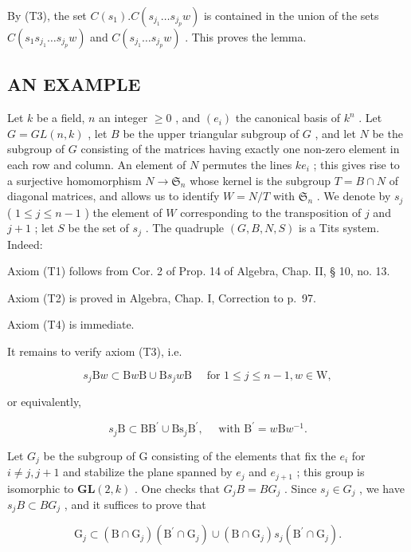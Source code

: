 By (T3), the set \(C(s_{1}).C(s_{j_{1}}\ldots s_{j_{p}}w)\) is contained in the union of the sets \(C(s_{1}s_{j_{1}}\ldots s_{j_{p}}w)\) and \(C(s_{j_{1}}\ldots s_{j_{p}}w)\) . This proves the lemma.

\subsection{AN EXAMPLE}

Let \(k\) be a field, \(n\) an integer \(\geqslant 0\) , and \((e_i)\) the canonical basis of \(k^n\) . Let \(G = GL(n, k)\) , let \(B\) be the upper triangular subgroup of \(G\) , and let \(N\) be the subgroup of \(G\) consisting of the matrices having exactly one non-zero element in each row and column. An element of \(N\) permutes the lines \(ke_i\) ; this gives rise to a surjective homomorphism \(N \to \mathfrak{S}_n\) whose kernel is the subgroup \(T = B \cap N\) of diagonal matrices, and allows us to identify \(W = N/T\) with \(\mathfrak{S}_n\) . We denote by \(s_j\) ( \(1 \leqslant j \leqslant n - 1\) ) the element of \(W\) corresponding to the transposition of \(j\) and \(j + 1\) ; let \(S\) be the set of \(s_j\) . The quadruple \((G, B, N, S)\) is a Tits system. Indeed:

Axiom (T1) follows from Cor. 2 of Prop. 14 of Algebra, Chap. II, § 10, no. 13.

Axiom (T2) is proved in Algebra, Chap. I, Correction to p.~97.

Axiom (T4) is immediate.

It remains to verify axiom (T3), i.e.

\[
s _ {j} \mathrm{B} w \subset \mathrm{B} w \mathrm{B} \cup \mathrm{B} s _ {j} w \mathrm{B} \quad \text { for } 1 \leqslant j \leqslant n - 1, w \in \mathrm{W},
\]

or equivalently,

\[
s _ {j} \mathrm{B} \subset \mathrm{BB} ^ {\prime} \cup \mathrm{Bs} _ {j} \mathrm{B} ^ {\prime}, \quad \text { with } \mathrm{B} ^ {\prime} = w \mathrm{B} w ^ {- 1}.
\]

Let \(G_{j}\) be the subgroup of G consisting of the elements that fix the \(e_{i}\) for \(i \neq j, j + 1\) and stabilize the plane spanned by \(e_{j}\) and \(e_{j+1}\) ; this group is isomorphic to \(\mathbf{GL}(2, k)\) . One checks that \(G_{j}B = BG_{j}\) . Since \(s_{j} \in G_{j}\) , we have \(s_{j}B \subset BG_{j}\) , and it suffices to prove that

\[
\mathrm{G} _ {j} \subset (\mathrm{B} \cap \mathrm{G} _ {j}) (\mathrm{B} ^ {\prime} \cap \mathrm{G} _ {j}) \cup (\mathrm{B} \cap \mathrm{G} _ {j}) s _ {j} (\mathrm{B} ^ {\prime} \cap \mathrm{G} _ {j}).
\]

